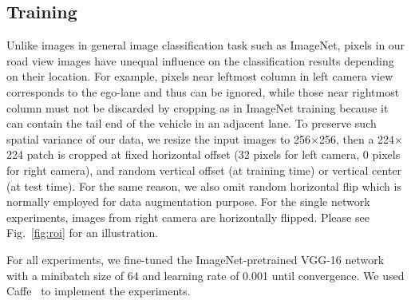 \documentclass[letterpaper, 10pt, conference]{ieeeconf}
\begin{document}
   \subsection{Training}%

    Unlike images in general image classification task such as ImageNet, pixels 
in our road view images have unequal influence on the classification results 
depending on their location. For example, pixels near leftmost column in left camera 
view corresponds to the ego-lane and thus can be ignored, while those near rightmost 
column must not be discarded by cropping as in ImageNet training because it can contain 
the tail end of the vehicle in an adjacent lane. To preserve such spatial variance of 
our data, we resize the input images to 256$\times$256, then a 224$\times$224 patch is 
cropped at fixed horizontal offset (32 pixels for left camera, 0 pixels for right camera), 
and random vertical offset (at training time) or vertical center (at test time). 
For the same reason, we also omit random horizontal flip which is normally employed 
for data augmentation purpose. For the single network experiments, images from right 
camera are horizontally flipped. Please see Fig.~\ref{fig:roi} for an illustration.

    For all experiments, we fine-tuned the ImageNet-pretrained VGG-16 network with 
a minibatch size of 64 and learning rate of 0.001 until convergence. We used 
Caffe~\cite{jia2014caffe} to implement the experiments.

	\begin{figure*}[t]
		\centering      
		~
		~
		\vspace{-0.1cm}
		\caption{Illustration of resizing and cropping process for SLCAN input}\label{fig:roi}
	\end{figure*}	
\end{document}
